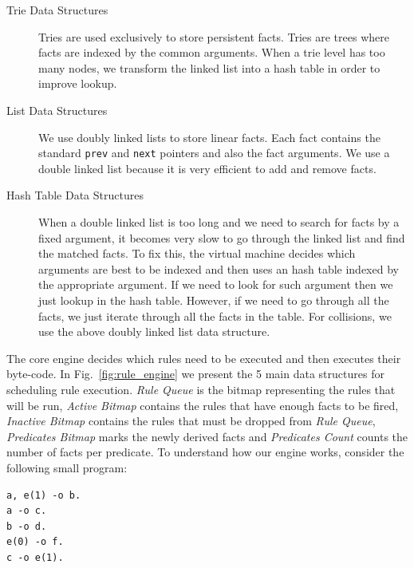 \begin{description}
   \item[Trie Data Structures]

   Tries are used exclusively to store persistent facts.
   Tries are trees where facts are indexed by the common arguments. When a trie level has too many nodes, we
   transform the linked list into a hash table in order to improve lookup.
      
   \item[List Data Structures]
   
   We use doubly linked lists to store linear facts. Each fact contains the standard \texttt{prev} and \texttt{next} pointers
   and also the fact arguments. We use a double linked list because it is very efficient to add and remove facts.
   
   \item[Hash Table Data Structures]
   
   When a double linked list is too long and we need to search for facts by a fixed argument, it becomes very slow to go through the
   linked list and find the matched facts. To fix this, the virtual machine decides which arguments are best to be indexed and then
   uses an hash table indexed by the appropriate argument. If we need to look for such argument then we just lookup in the hash table. However,
   if we need to go through all the facts, we just iterate through all the facts in the table. For collisions, we use the above doubly linked list
   data structure.
\end{description}

The core engine decides which rules need to be executed and then executes their byte-code.
In Fig.~\ref{fig:rule_engine} we present the 5 main data structures for scheduling rule execution.
\emph{Rule Queue} is the bitmap representing the rules that will be run, \emph{Active Bitmap} contains the rules that have enough
facts to be fired, \emph{Inactive Bitmap} contains the rules that must be dropped from \emph{Rule Queue}, \emph{Predicates Bitmap}
marks the newly derived facts and \emph{Predicates Count} counts the number of facts per predicate.
To understand how our engine works, consider
the following small program:

\begin{Verbatim}
a, e(1) -o b.
a -o c.
b -o d.
e(0) -o f.
c -o e(1).
\end{Verbatim}

